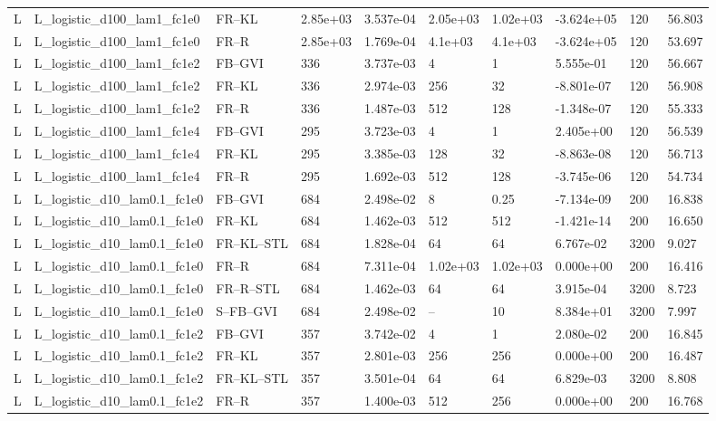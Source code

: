 \begin{tabular}{llllllllll}
L & L\_logistic\_d100\_lam1\_fc1e0 & FR--KL & 2.85e+03 & 3.537e-04 & 2.05e+03 & 1.02e+03 & -3.624e+05 & 120 & 56.803 \\
L & L\_logistic\_d100\_lam1\_fc1e0 & FR--R & 2.85e+03 & 1.769e-04 & 4.1e+03 & 4.1e+03 & -3.624e+05 & 120 & 53.697 \\
L & L\_logistic\_d100\_lam1\_fc1e2 & FB--GVI & 336 & 3.737e-03 & 4 & 1 & 5.555e-01 & 120 & 56.667 \\
L & L\_logistic\_d100\_lam1\_fc1e2 & FR--KL & 336 & 2.974e-03 & 256 & 32 & -8.801e-07 & 120 & 56.908 \\
L & L\_logistic\_d100\_lam1\_fc1e2 & FR--R & 336 & 1.487e-03 & 512 & 128 & -1.348e-07 & 120 & 55.333 \\
L & L\_logistic\_d100\_lam1\_fc1e4 & FB--GVI & 295 & 3.723e-03 & 4 & 1 & 2.405e+00 & 120 & 56.539 \\
L & L\_logistic\_d100\_lam1\_fc1e4 & FR--KL & 295 & 3.385e-03 & 128 & 32 & -8.863e-08 & 120 & 56.713 \\
L & L\_logistic\_d100\_lam1\_fc1e4 & FR--R & 295 & 1.692e-03 & 512 & 128 & -3.745e-06 & 120 & 54.734 \\
L & L\_logistic\_d10\_lam0.1\_fc1e0 & FB--GVI & 684 & 2.498e-02 & 8 & 0.25 & -7.134e-09 & 200 & 16.838 \\
L & L\_logistic\_d10\_lam0.1\_fc1e0 & FR--KL & 684 & 1.462e-03 & 512 & 512 & -1.421e-14 & 200 & 16.650 \\
L & L\_logistic\_d10\_lam0.1\_fc1e0 & FR--KL--STL & 684 & 1.828e-04 & 64 & 64 & 6.767e-02 & 3200 & 9.027 \\
L & L\_logistic\_d10\_lam0.1\_fc1e0 & FR--R & 684 & 7.311e-04 & 1.02e+03 & 1.02e+03 & 0.000e+00 & 200 & 16.416 \\
L & L\_logistic\_d10\_lam0.1\_fc1e0 & FR--R--STL & 684 & 1.462e-03 & 64 & 64 & 3.915e-04 & 3200 & 8.723 \\
L & L\_logistic\_d10\_lam0.1\_fc1e0 & S--FB--GVI & 684 & 2.498e-02 & -- & 10 & 8.384e+01 & 3200 & 7.997 \\
L & L\_logistic\_d10\_lam0.1\_fc1e2 & FB--GVI & 357 & 3.742e-02 & 4 & 1 & 2.080e-02 & 200 & 16.845 \\
L & L\_logistic\_d10\_lam0.1\_fc1e2 & FR--KL & 357 & 2.801e-03 & 256 & 256 & 0.000e+00 & 200 & 16.487 \\
L & L\_logistic\_d10\_lam0.1\_fc1e2 & FR--KL--STL & 357 & 3.501e-04 & 64 & 64 & 6.829e-03 & 3200 & 8.808 \\
L & L\_logistic\_d10\_lam0.1\_fc1e2 & FR--R & 357 & 1.400e-03 & 512 & 256 & 0.000e+00 & 200 & 16.768 \\

\end{tabular}
